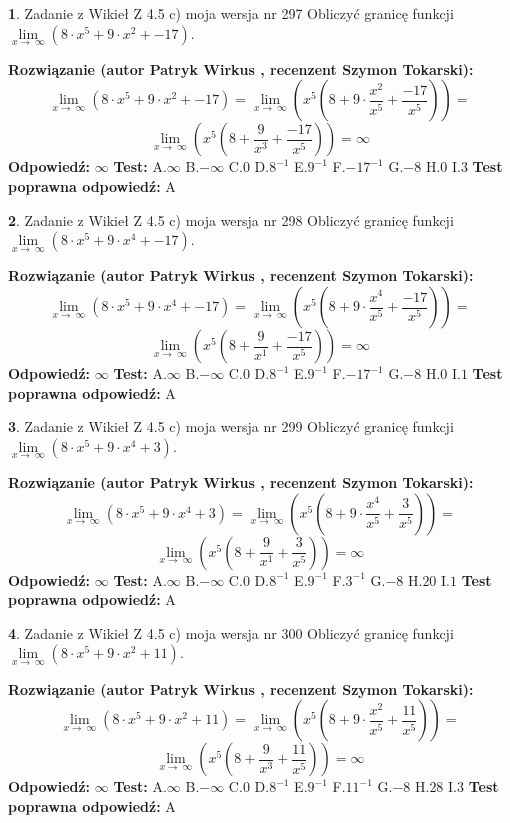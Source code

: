 \documentclass[12pt, a4paper]{article}
\theoremstyle{definition} %
\newtheorem{zad}{}
\newcommand{\zadStart}[1]{\begin{zad}#1\newline}
\newcommand{\zadStop}{\end{zad}}
\newcommand{\rozwStart}[2]{\noindent \textbf{Rozwiązanie (autor #1 , recenzent #2): }\newline}
\newcommand{\rozwStop}{\newline}
\newcommand{\odpStart}{\noindent \textbf{Odpowiedź:}\newline}
\newcommand{\odpStop}{\newline}
\newcommand{\testStart}{\noindent \textbf{Test:}\newline}
\newcommand{\testStop}{\newline}
\newcommand{\kluczStart}{\noindent \textbf{Test poprawna odpowiedź:}\newline}
\newcommand{\kluczStop}{\newline}
\begin{document}
\zadStart{Zadanie z Wikieł Z 4.5 c) moja wersja nr 297}
Obliczyć granicę funkcji  $\lim\limits_{x\to\ \infty}(8 \cdot x^{5}+9 \cdot x^{2}+-17)$.
\zadStop
\rozwStart{Patryk Wirkus}{Szymon Tokarski}
$$\lim\limits_{x\to\ \infty}(8 \cdot x^{5}+9 \cdot x^{2}+-17) = \lim\limits_{x\to\ \infty}(x^{5}(8 +9 \cdot \frac{x^{2}}{x^{5}}+\frac{-17}{x^{5}})) =$$ $$\lim\limits_{x\to\ \infty}(x^{5}(8 +\frac{9}{x^{3}}+\frac{-17}{x^{5}})) =\infty$$
\rozwStop
\odpStart
$\infty$
\odpStop
\testStart
A.$\infty$ B.$-\infty$ C.$0$ D.$8^{-1}$ E.$9^{-1}$
F.$-17^{-1}$ G.$-8$
H.$0$
I.$3$
\testStop
\kluczStart
A
\kluczStop



\zadStart{Zadanie z Wikieł Z 4.5 c) moja wersja nr 298}
Obliczyć granicę funkcji  $\lim\limits_{x\to\ \infty}(8 \cdot x^{5}+9 \cdot x^{4}+-17)$.
\zadStop
\rozwStart{Patryk Wirkus}{Szymon Tokarski}
$$\lim\limits_{x\to\ \infty}(8 \cdot x^{5}+9 \cdot x^{4}+-17) = \lim\limits_{x\to\ \infty}(x^{5}(8 +9 \cdot \frac{x^{4}}{x^{5}}+\frac{-17}{x^{5}})) =$$ $$\lim\limits_{x\to\ \infty}(x^{5}(8 +\frac{9}{x^{1}}+\frac{-17}{x^{5}})) =\infty$$
\rozwStop
\odpStart
$\infty$
\odpStop
\testStart
A.$\infty$ B.$-\infty$ C.$0$ D.$8^{-1}$ E.$9^{-1}$
F.$-17^{-1}$ G.$-8$
H.$0$
I.$1$
\testStop
\kluczStart
A
\kluczStop



\zadStart{Zadanie z Wikieł Z 4.5 c) moja wersja nr 299}
Obliczyć granicę funkcji  $\lim\limits_{x\to\ \infty}(8 \cdot x^{5}+9 \cdot x^{4}+3)$.
\zadStop
\rozwStart{Patryk Wirkus}{Szymon Tokarski}
$$\lim\limits_{x\to\ \infty}(8 \cdot x^{5}+9 \cdot x^{4}+3) = \lim\limits_{x\to\ \infty}(x^{5}(8 +9 \cdot \frac{x^{4}}{x^{5}}+\frac{3}{x^{5}})) =$$ $$\lim\limits_{x\to\ \infty}(x^{5}(8 +\frac{9}{x^{1}}+\frac{3}{x^{5}})) =\infty$$
\rozwStop
\odpStart
$\infty$
\odpStop
\testStart
A.$\infty$ B.$-\infty$ C.$0$ D.$8^{-1}$ E.$9^{-1}$
F.$3^{-1}$ G.$-8$
H.$20$
I.$1$
\testStop
\kluczStart
A
\kluczStop



\zadStart{Zadanie z Wikieł Z 4.5 c) moja wersja nr 300}
Obliczyć granicę funkcji  $\lim\limits_{x\to\ \infty}(8 \cdot x^{5}+9 \cdot x^{2}+11)$.
\zadStop
\rozwStart{Patryk Wirkus}{Szymon Tokarski}
$$\lim\limits_{x\to\ \infty}(8 \cdot x^{5}+9 \cdot x^{2}+11) = \lim\limits_{x\to\ \infty}(x^{5}(8 +9 \cdot \frac{x^{2}}{x^{5}}+\frac{11}{x^{5}})) =$$ $$\lim\limits_{x\to\ \infty}(x^{5}(8 +\frac{9}{x^{3}}+\frac{11}{x^{5}})) =\infty$$
\rozwStop
\odpStart
$\infty$
\odpStop
\testStart
A.$\infty$ B.$-\infty$ C.$0$ D.$8^{-1}$ E.$9^{-1}$
F.$11^{-1}$ G.$-8$
H.$28$
I.$3$
\testStop
\kluczStart
A
\kluczStop
\end{document}
